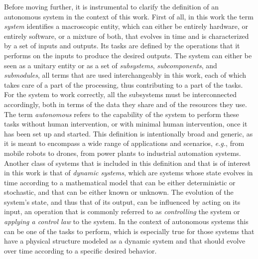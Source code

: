 Before moving further, it is instrumental to clarify the definition of an autonomous system in the context of this work. First of all, in this work the term \emph{system} identifies a macroscopic entity, which can either be entirely hardware, or entirely software, or a mixture of both, that evolves in time and is characterized by a set of inputs and outputs. Its tasks are defined by the operations that it performs on the inputs to produce the desired outputs. The system can either be seen as a unitary entity or as a set of \emph{subsystems}, \emph{subcomponents}, and \emph{submodules}, all terms that are used interchangeably in this work, each of which takes care of a part of the processing, thus contributing to a part of the tasks. For the system to work correctly, all the subsystems must be interconnected accordingly, both in terms of the data they share and of the resources they use. The term \emph{autonomous} refers to the capability of the system to perform these tasks without human intervention, or with minimal human intervention, once it has been set up and started. This definition is intentionally broad and generic, as it is meant to encompass a wide range of applications and scenarios, \emph{e.g.}, from mobile robots to drones, from power plants to industrial automation systems. Another class of systems that is included in this definition and that is of interest in this work is that of \emph{dynamic systems}, which are systems whose state evolves in time according to a mathematical model that can be either deterministic or stochastic, and that can be either known or unknown. The evolution of the system's state, and thus that of its output, can be influenced by acting on its input, an operation that is commonly referred to as \emph{controlling} the system or \emph{applying a control law} to the system. In the context of autonomous systems this can be one of the tasks to perform, which is especially true for those systems that have a physical structure modeled as a dynamic system and that should evolve over time according to a specific desired behavior.




